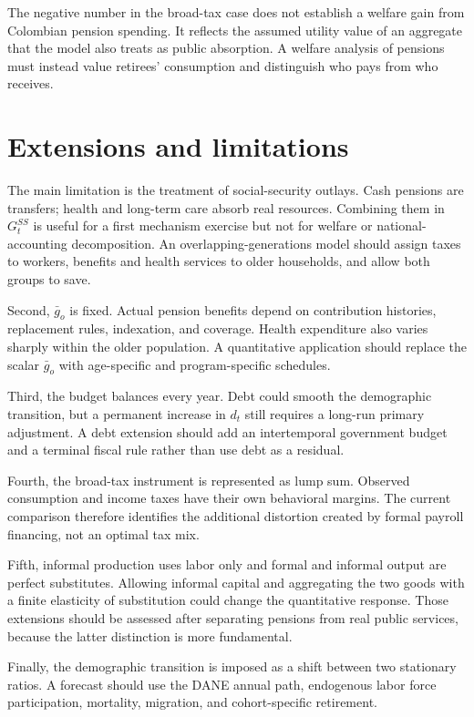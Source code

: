 \documentclass[12pt]{article}
\begin{document}
The negative number in the broad-tax case does not establish a welfare gain
from Colombian pension spending. It reflects the assumed utility value of an
aggregate that the model also treats as public absorption. A welfare analysis
of pensions must instead value retirees' consumption and distinguish who pays
from who receives.

\section{Extensions and limitations}

The main limitation is the treatment of social-security outlays. Cash pensions
are transfers; health and long-term care absorb real resources. Combining them
in $G_t^{SS}$ is useful for a first mechanism exercise but not for welfare or
national-accounting decomposition. An overlapping-generations model should
assign taxes to workers, benefits and health services to older households, and
allow both groups to save.

Second, $\bar g_o$ is fixed. Actual pension benefits depend on contribution
histories, replacement rules, indexation, and coverage. Health expenditure also
varies sharply within the older population. A quantitative application should
replace the scalar $\bar g_o$ with age-specific and program-specific schedules.

Third, the budget balances every year. Debt could smooth the demographic
transition, but a permanent increase in $d_t$ still requires a long-run primary
adjustment. A debt extension should add an intertemporal government budget and
a terminal fiscal rule rather than use debt as a residual.

Fourth, the broad-tax instrument is represented as lump sum. Observed
consumption and income taxes have their own behavioral margins. The current
comparison therefore identifies the additional distortion created by formal
payroll financing, not an optimal tax mix.

Fifth, informal production uses labor only and formal and informal output are
perfect substitutes. Allowing informal capital and aggregating the two goods
with a finite elasticity of substitution could change the quantitative
response. Those extensions should be assessed after separating pensions from
real public services, because the latter distinction is more fundamental.

Finally, the demographic transition is imposed as a shift between two
stationary ratios. A forecast should use the DANE annual path, endogenous labor
force participation, mortality, migration, and cohort-specific retirement.
\end{document}
